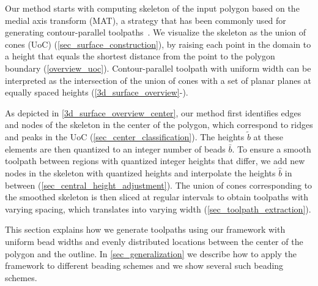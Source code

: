 Our method starts with computing  skeleton of the input polygon based on the medial axis transform (MAT), a strategy that has been commonly used for generating contour-parallel toolpaths~\cite{eiamsa2003toward}. 
We visualize the skeleton as the union of cones (UoC) (\cref{sec_surface_construction}), by raising each point in the domain to a height that equals the shortest distance from the point to the polygon boundary (\cref{overview_uoc}).
Contour-parallel toolpath with uniform width can be interpreted as the intersection of the union of cones with a set of planar planes at equally spaced heights (\cref{3d_surface_overview}-).

As depicted in \cref{3d_surface_overview_center}, our method first identifies edges and nodes of the skeleton in the center of the polygon, which correspond to ridges and peaks in the UoC  (\cref{sec_center_classification}).
The heights $\tilde{b}$ at these elements are then quantized to an integer number of beads $\bar{b}$.
To ensure a smooth toolpath between regions with quantized integer heights that differ, we add new nodes in the skeleton with quantized heights and interpolate the heights $\hat{b}$ in between (\cref{sec_central_height_adjustment}).
The union of cones corresponding to the smoothed skeleton is then sliced at regular intervals to obtain toolpaths with varying spacing, which translates into varying width (\cref{sec_toolpath_extraction}).


This section explains how we generate toolpaths using our framework with uniform bead widths and evenly distributed locations between the center of the polygon and the outline.
In \cref{sec_generalization} we describe how to apply the framework to different beading schemes and we show several such beading schemes.



